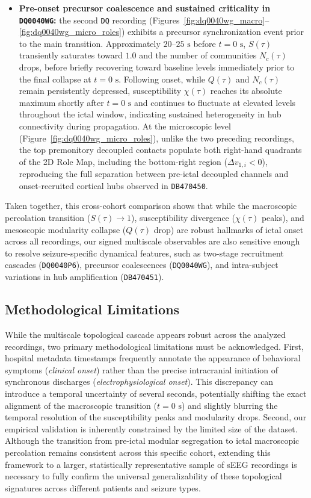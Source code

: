 \begin{itemize}
    \item \textbf{Pre-onset precursor coalescence and sustained criticality in \texttt{DQ0040WG}:} the second \texttt{DQ} recording (Figures~\ref{fig:dq0040wg_macro}--\ref{fig:dq0040wg_micro_roles}) exhibits a precursor synchronization event prior to the main transition. Approximately $20\text{--}25\text{ s}$ before $t = 0\text{ s}$, $S(\tau)$ transiently saturates toward $1.0$ and the number of communities $N_c(\tau)$ drops, before briefly recovering toward baseline levels immediately prior to the final collapse at $t = 0\text{ s}$. Following onset, while $Q(\tau)$ and $N_c(\tau)$ remain persistently depressed, susceptibility $\chi(\tau)$ reaches its absolute maximum shortly after $t = 0\text{ s}$ and continues to fluctuate at elevated levels throughout the ictal window, indicating sustained heterogeneity in hub connectivity during propagation. At the microscopic level (Figure~\ref{fig:dq0040wg_micro_roles}), unlike the two preceding recordings, the top premonitory decoupled contacts populate both right-hand quadrants of the 2D Role Map, including the bottom-right region ($\Delta v_{1,i} < 0$), reproducing the full separation between pre-ictal decoupled channels and onset-recruited cortical hubs observed in \texttt{DB470450}.
\end{itemize}

Taken together, this cross-cohort comparison shows that while the macroscopic percolation transition ($S(\tau) \to 1$), susceptibility divergence ($\chi(\tau)$ peaks), and mesoscopic modularity collapse ($Q(\tau)$ drop) are robust hallmarks of ictal onset across all recordings, our signed multiscale observables are also sensitive enough to resolve seizure-specific dynamical features, such as two-stage recruitment cascades (\texttt{DQ0040P6}), precursor coalescences (\texttt{DQ0040WG}), and intra-subject variations in hub amplification (\texttt{DB470451}).

\subsection{Methodological Limitations}
\label{subsec:limitations}

While the multiscale topological cascade appears robust across the analyzed recordings, two primary methodological limitations must be acknowledged. First, hospital metadata timestamps frequently annotate the appearance of behavioral symptoms (\textit{clinical onset}) rather than the precise intracranial initiation of synchronous discharges (\textit{electrophysiological onset}). This discrepancy can introduce a temporal uncertainty of several seconds, potentially shifting the exact alignment of the macroscopic transition ($t = 0\text{ s}$) and slightly blurring the temporal resolution of the susceptibility peaks and modularity drops. Second, our empirical validation is inherently constrained by the limited size of the dataset. Although the transition from pre-ictal modular segregation to ictal macroscopic percolation remains consistent across this specific cohort, extending this framework to a larger, statistically representative sample of sEEG recordings is necessary to fully confirm the universal generalizability of these topological signatures across different patients and seizure types.